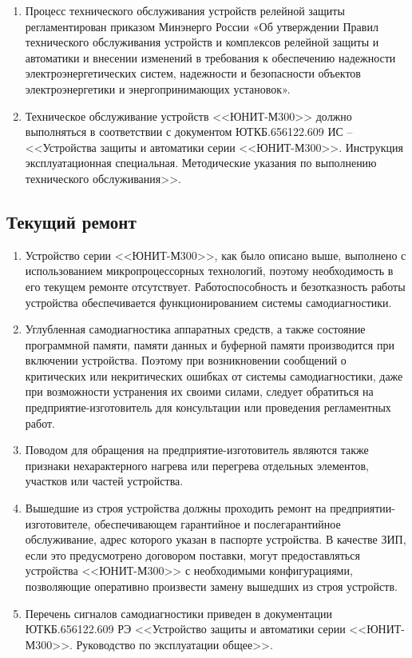 \documentclass[a4paper, 12pt,table, hidelinks, DIV=calc]{extarticle} %
\begin{document}
\begin{enumerate}[label=\arabic{section}.\arabic{subsection}.\arabic*, labelsep=4pt, leftmargin=0pt, itemindent=57pt]

\item\sloppy
Процесс  технического  обслуживания  устройств  релейной  защиты  регламентирован  приказом Минэнерго  России  «Об  утверждении  Правил  технического  обслуживания  устройств  и  комплексов релейной  защиты  и  автоматики  и  внесении  изменений  в  требования  к  обеспечению  надежности электроэнергетических  систем,  надежности  и  безопасности  объектов  электроэнергетики  и энергопринимающих установок».
\item
Техническое обслуживание устройств <<ЮНИТ-М300>> должно выполняться в соответствии с документом ЮТКБ.656122.609 ИС – <<Устройства защиты и автоматики серии <<ЮНИТ-М300>>. Инструкция эксплуатационная специальная. Методические указания по выполнению технического обслуживания>>.

\end{enumerate}

\color{uniblue}\subsection{Текущий ремонт}\color{black}

\begin{enumerate}[label=\arabic{section}.\arabic{subsection}.\arabic*, labelsep=4pt, leftmargin=0pt, itemindent=57pt]

\item
Устройство серии <<ЮНИТ-М300>>, как было описано выше, выполнено с использованием микропроцессорных технологий, поэтому необходимость в его текущем ремонте отсутствует. Работоспособность и безотказность работы устройства обеспечивается функционированием системы самодиагностики.
\item
Углубленная самодиагностика аппаратных средств, а также состояние программной памяти, памяти данных  и  буферной  памяти  производится  при  включении  устройства.  Поэтому  при  возникновении сообщений о критических или некритических ошибках от системы самодиагностики, даже при возможности устранения  их  своими  силами,  следует  обратиться  на  предприятие-изготовитель для  консультации или проведения регламентных работ.
\item 
Поводом  для  обращения  на  предприятие-изготовитель  являются  также  признаки  нехарактерного нагрева или перегрева отдельных элементов, участков или частей устройства.
\item
Вышедшие  из  строя  устройства  должны  проходить  ремонт  на  предприятии-изготовителе, обеспечивающем  гарантийное  и  послегарантийное  обслуживание, адрес которого  указан  в  паспорте устройства.  В  качестве  ЗИП,  если  это  предусмотрено  договором  поставки,  могут  предоставляться устройства  <<ЮНИТ-М300>> с необходимыми  конфигурациями,  позволяющие  оперативно  произвести  замену вышедших из строя устройств.
\item
Перечень сигналов самодиагностики приведен в документации ЮТКБ.656122.609 РЭ <<Устройство защиты и автоматики серии <<ЮНИТ-М300>>. Руководство по эксплуатации общее>>.
\end{enumerate}
\end{document}
